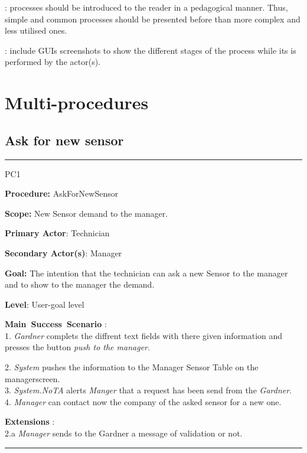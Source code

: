 : processes should be introduced to the
reader in a pedagogical manner. Thus, simple and common processes should be presented before
than more complex and less utilised ones.

: include GUIs screenshots to show the
different stages of the process while its is performed by the actor(s).






\section{Multi-procedures}

\subsection{Ask for new sensor}

\vspace{0.5cm}
\hrule
\hfill \break
\begin{lyxlist}{PC1}
\small{
\item [\textbf{Procedure:}] AskForNewSensor
\item [\textbf{Scope:}] New Sensor demand to the manager.
\item [\textbf{Primary Actor}:] Technician
\item [\textbf{Secondary Actor(s)}:] Manager
\item [\textbf{Goal:}] The intention that the technician can ask a new Sensor to
the manager and to show to the manager the demand.
\item [\textbf{Level}:] User-goal level
\item [\textbf{Main~Success~Scenario}]:\\
1. \emph{Gardner} complets the diffrent text fields with there given
information and presses the button \emph{push to the manager}. 

2. \emph{System} pushes the information to the Manager Sensor Table on the
 managerscreen. \\
3. \emph{System.NoTA} alerts \emph{Manger} that a request has been send from
the \emph{Gardner}.\\
4. \emph{Manager} can contact now the company of the asked sensor for a new
one.\\
\item [\textbf{Extensions}]:\\
2.a  \emph{Manager} sends to the Gardner a message of
validation or not.\\
}
\end{lyxlist}
\hfill \break
\hrule
\vspace{0.5cm}


